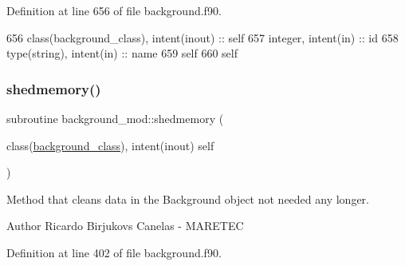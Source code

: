 Definition at line 656 of file background.\+f90.


\begin{DoxyCode}
656     \textcolor{keywordtype}{class}(background\_class), \textcolor{keywordtype}{intent(inout)} :: self
657     \textcolor{keywordtype}{integer}, \textcolor{keywordtype}{intent(in)} :: id
658     \textcolor{keywordtype}{type}(string), \textcolor{keywordtype}{intent(in)} :: name
659     self%
660     self%
\end{DoxyCode}
\mbox{\label{namespacebackground__mod_a2c75c9011305adad2f19fc2233df700d}} 
\subsubsection{\texorpdfstring{shedmemory()}{shedmemory()}}
{\footnotesize\ttfamily subroutine background\+\_\+mod\+::shedmemory (\begin{DoxyParamCaption}\item[{class(\mbox{\hyperlink{structbackground__mod_1_1background__class}{background\+\_\+class}}), intent(inout)}]{self }\end{DoxyParamCaption})\hspace{0.3cm}{\ttfamily [private]}}



Method that cleans data in the Background object not needed any longer. 

\begin{DoxyAuthor}{Author}
Ricardo Birjukovs Canelas -\/ M\+A\+R\+E\+T\+EC 
\end{DoxyAuthor}


Definition at line 402 of file background.\+f90.


